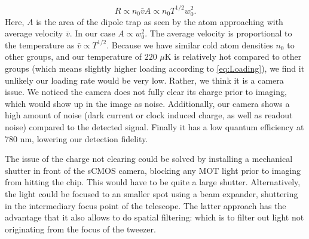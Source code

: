 \begin{equation}\label{eq:Loading}
    R \propto n_0 \bar{v} A\propto n_0 T^{1/2} w_0^2.
\end{equation}
Here, $A$ is the area of the dipole trap as seen by the atom approaching with average velocity $\bar{v}$. 
In our case $A \propto w_0^2$.
The average velocity is proportional to the temperature as $\bar{v}\propto T^{1/2}$.
Because we have similar cold atom densities $n_0$ to other groups, and our temperature of $220$ $\mu$K is relatively hot compared to other groups (which means slightly higher loading according to \cref{eq:Loading}), we find it unlikely our loading rate would be very low. 
Rather, we think it is a camera issue. 
We noticed the camera does not fully clear its charge prior to imaging, which would show up in the image as noise. 
Additionally, our camera shows a high amount of noise (dark current or clock induced charge, as well as readout noise) compared to the detected signal.
Finally it has a low quantum efficiency at 780 nm, lowering our detection fidelity. 

The issue of the charge not clearing could be solved by installing a mechanical shutter in front of the sCMOS camera, blocking any MOT light prior to imaging from hitting the chip. 
This would have to be quite a large shutter.
Alternatively, the light could be focused to an smaller spot using a beam expander, shuttering in the intermediary focus point of the telescope. 
The latter approach has the advantage that it also allows to do spatial filtering: which is to filter out light not originating from the focus of the tweezer. 
 

